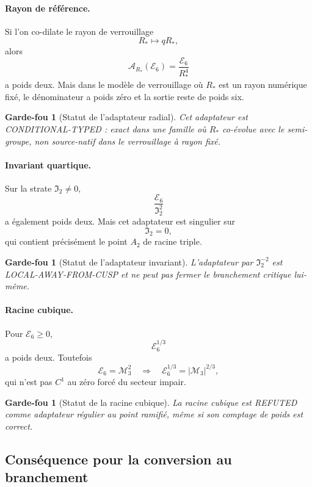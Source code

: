 \documentclass[11pt,a4paper]{article}
\newtheorem{guardrail}[theorem]{Garde-fou}
\begin{document}
\paragraph{Rayon de référence.}
Si l'on co-dilate le rayon de verrouillage
\[
 R_*\longmapsto qR_*,
\]
alors
\[
 \boxed{
 \mathcal A_{R_*}(\mathscr E_6)
 =
 \frac{\mathscr E_6}{R_*^4}}
\]
a poids deux. Mais dans le modèle de verrouillage où $R_*$ est un rayon numérique fixé, le dénominateur a poids zéro et la sortie reste de poids six.

\begin{guardrail}[Statut de l'adaptateur radial]
Cet adaptateur est \emph{CONDITIONAL-TYPED} : exact dans une famille où $R_*$ co-évolue avec le semi-groupe, non source-natif dans le verrouillage à rayon fixé.
\end{guardrail}

\paragraph{Invariant quartique.}
Sur la strate $\mathfrak I_2\neq0$,
\[
 \boxed{
 \frac{\mathscr E_6}{\mathfrak I_2^2}}
\]
a également poids deux. Mais cet adaptateur est singulier sur
\[
 \mathfrak I_2=0,
\]
qui contient précisément le point $A_2$ de racine triple.

\begin{guardrail}[Statut de l'adaptateur invariant]
L'adaptateur par $\mathfrak I_2^{-2}$ est \emph{LOCAL-AWAY-FROM-CUSP} et ne peut pas fermer le branchement critique lui-même.
\end{guardrail}

\paragraph{Racine cubique.}
Pour $\mathscr E_6\ge0$,
\[
 \mathscr E_6^{1/3}
\]
a poids deux. Toutefois
\[
 \mathscr E_6=\mathcal M_3^2
 \quad\Longrightarrow\quad
 \mathscr E_6^{1/3}=|\mathcal M_3|^{2/3},
\]
qui n'est pas $C^1$ au zéro forcé du secteur impair.

\begin{guardrail}[Statut de la racine cubique]
La racine cubique est \emph{REFUTED} comme adaptateur régulier au point ramifié, même si son comptage de poids est correct.
\end{guardrail}

\subsection{Conséquence pour la conversion au branchement}
\end{document}
